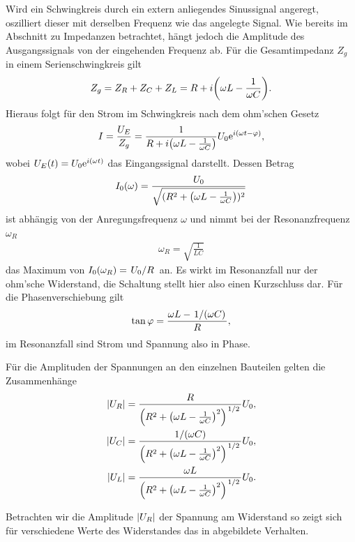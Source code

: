 Wird ein Schwingkreis durch ein extern anliegendes Sinussignal angeregt, oszilliert dieser mit derselben Frequenz wie das angelegte Signal. Wie bereits im Abschnitt zu Impedanzen betrachtet, hängt jedoch die Amplitude des Ausgangssignals von der eingehenden Frequenz ab. Für die Gesamtimpedanz $Z_g$ in einem Serienschwingkreis gilt
\begin{align}
  Z_g = Z_R + Z_C + Z_L = R + i\qty(\omega L - \frac{1}{\omega C}).
\end{align}
Hieraus folgt für den Strom im Schwingkreis nach dem ohm'schen Gesetz
\begin{align}
  I = \frac{U_E}{Z_g} = \frac{1}{R + i\qty(\omega L - \frac{1}{\omega C})} U_0 \text{e}^{i(\omega t - \varphi)},
\end{align}
wobei $U_E(t) = U_0 \text{e}^{i(\omega t)}$ das Eingangssignal darstellt. Dessen Betrag
\begin{align}
  I_0(\omega) = \frac{U_0}{\sqrt{(R^2 + \qty(\omega L - \frac{1}{\omega C}))^2}}
\end{align}
ist abhängig von der Anregungsfrequenz $\omega$ und nimmt bei der Resonanzfrequenz $\omega_R$
\begin{align}
  \omega_R = \sqrt{\frac{1}{LC}}
\end{align}
das Maximum von $I_0(\omega_R) = \ffrac{U_0}{R}$ an. Es wirkt im Resonanzfall nur der ohm'sche Widerstand, die Schaltung stellt hier also einen Kurzschluss dar. Für die Phasenverschiebung gilt
\begin{align}
  \tan \varphi = \frac{\omega L - \ffrac{1}{(\omega C)}}{R},
\end{align}
im Resonanzfall sind Strom und Spannung also in Phase.

Für die Amplituden der Spannungen an den einzelnen Bauteilen gelten die Zusammenhänge
\begin{align}
\qty| U_R | = \frac{R}{\qty( R^2 + \qty( \omega L - \frac{1}{\omega C} )^2 )^{\ffrac{1}{2}}} U_0,\\
\qty| U_C | = \frac{1/(\omega C)}{\qty( R^2 + \qty( \omega L - \frac{1}{\omega C} )^2 )^{\ffrac{1}{2}}} U_0,\\
\qty| U_L | = \frac{\omega L}{\qty( R^2 + \qty( \omega L - \frac{1}{\omega C} )^2 )^{\ffrac{1}{2}}} U_0.
\end{align}

Betrachten wir die Amplitude $\qty| U_R |$ der Spannung am Widerstand so zeigt sich für verschiedene Werte des Widerstandes das in  abgebildete Verhalten. 

